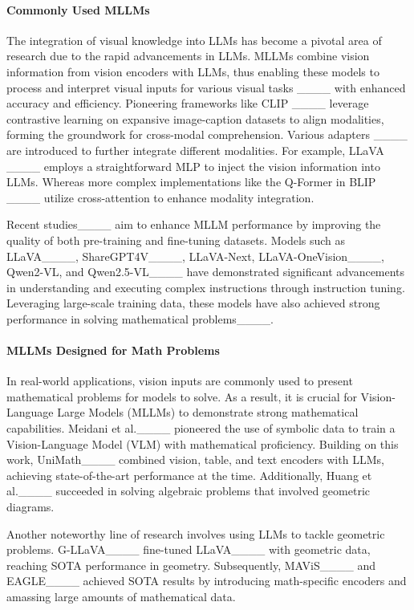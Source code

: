 \paragraph{Commonly Used MLLMs}
The integration of visual knowledge into LLMs has become a pivotal area of research due to the rapid advancements in LLMs. MLLMs combine vision information from vision encoders with LLMs, thus enabling these models to process and interpret visual inputs for various visual tasks ____ with enhanced accuracy and efficiency. Pioneering frameworks like CLIP ____ leverage contrastive learning on expansive image-caption datasets to align modalities, forming the groundwork for cross-modal comprehension. Various adapters ____ are introduced to further integrate different modalities. For example, LLaVA ____ employs a straightforward MLP to inject the vision information into LLMs. Whereas more complex implementations like the Q-Former in BLIP ____ utilize cross-attention to enhance modality integration. 

Recent studies____ aim to enhance MLLM performance by improving the quality of both pre-training and fine-tuning datasets. Models such as LLaVA____, ShareGPT4V____, LLaVA-Next, LLaVA-OneVision____, Qwen2-VL, and Qwen2.5-VL____ have demonstrated significant advancements in understanding and executing complex instructions through instruction tuning. Leveraging large-scale training data, these models have also achieved strong performance in solving mathematical problems____.

\paragraph{MLLMs Designed for Math Problems}
In real-world applications, vision inputs are commonly used to present mathematical problems for models to solve. As a result, it is crucial for Vision-Language Large Models (MLLMs) to demonstrate strong mathematical capabilities. Meidani et al.____ pioneered the use of symbolic data to train a Vision-Language Model (VLM) with mathematical proficiency. Building on this work, UniMath____ combined vision, table, and text encoders with LLMs, achieving state-of-the-art performance at the time. Additionally, Huang et al.____ succeeded in solving algebraic problems that involved geometric diagrams.

Another noteworthy line of research involves using LLMs to tackle geometric problems. G-LLaVA____ fine-tuned LLaVA____ with geometric data, reaching SOTA performance in geometry. Subsequently, MAViS____ and EAGLE____ achieved SOTA results by introducing math-specific encoders and amassing large amounts of mathematical data.

